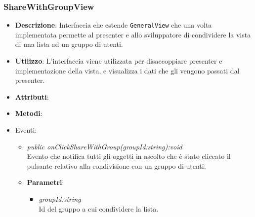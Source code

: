 \begin{itemize}
\subsubsection{ShareWithGroupView}
\begin{itemize}
\item \textbf{Descrizione}: Interfaccia che estende \texttt{GeneralView} che una volta implementata permette al presenter e allo sviluppatore di condividere la vista di una lista ad un gruppo di utenti.
\item \textbf{Utilizzo}: L'interfaccia viene utilizzata per disaccoppiare presenter e implementazione della vista, e visualizza i dati che gli vengono passati dal presenter.
\item \textbf{Attributi}: 
\item \textbf{Metodi}:
\item{Eventi}:
	\begin{itemize}
	\item \textit{public onClickShareWithGroup(groupId:string):void}\\
	Evento che notifica tutti gli oggetti in ascolto che è stato cliccato il pulsante relativo alla condivisione con un gruppo di utenti.										\item{\textbf{Parametri}: \begin{itemize}
			\item \textit{groupId:string}\\
			Id del gruppo a cui condividere la lista.
			\end{itemize}}
	\end{itemize}
\end{itemize}


\end{itemize}

